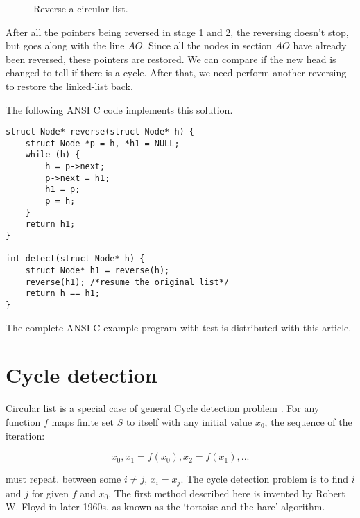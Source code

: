 \documentclass{article}
\begin{document}
\begin{figure}[htdp]
{
}
\caption{Reverse a circular list.}
\label{fig:reverse}
\end{figure}

After all the pointers being reversed in stage 1 and 2, the reversing doesn't
stop, but goes along with the line $AO$. Since all the nodes in section $AO$
have already been reversed, these pointers are restored. We can compare if
the new head is changed to tell if there is a cycle. After that, we need
perform another reversing to restore the linked-list back.

The following ANSI C code implements this solution.

\lstset{language=C}
\begin{lstlisting}
struct Node* reverse(struct Node* h) {
    struct Node *p = h, *h1 = NULL;
    while (h) {
        h = p->next;
        p->next = h1;
        h1 = p;
        p = h;
    }
    return h1;
}

int detect(struct Node* h) {
    struct Node* h1 = reverse(h);
    reverse(h1); /*resume the original list*/
    return h == h1;
}
\end{lstlisting}


The complete ANSI C example program with test is distributed with this article.

\section{Cycle detection}
Circular list is a special case of general Cycle detection problem \cite{wiki-cycle-detection}.
For any function $f$ maps finite set $S$ to itself with any initial value $x_0$, the sequence of the
iteration:

\[
x_0, x_1 = f(x_0), x_2 = f(x_1), ...
\]

must repeat. between some $i \neq j$, $x_i = x_j$. The cycle detection problem is to find $i$ and $j$ for
given $f$ and $x_0$. The first method described here is invented by Robert W. Floyd in later 1960s, as known
as the `tortoise and the hare' algorithm.
\end{document}
